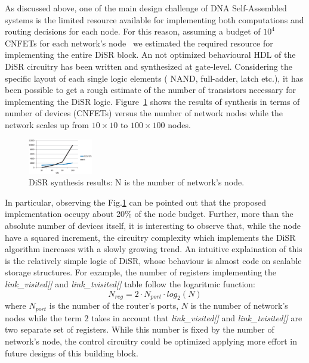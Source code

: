 As discussed above, one of the main design challenge of DNA
Self-Assembled systems is the limited resource available for
implementing both computations and routing decisions for each node.
For this reason, assuming a budget of $10^4$ CNFETs for each network's
node~\cite{liu_jetcs} we estimated the required resource for
implementing the entire DiSR block. An not optimized behavioural
HDL of the DiSR circuitry has been written and synthesized at gate-level.
Considering the specific layout of each single logic elements ( NAND,
full-adder, latch etc.), it has been possible to get a rough estimate
of the number of transistors necessary for implementing the DiSR
logic.  Figure~\ref{fig:imp_trend} shows the results of synthesis in
terms of number of devices (CNFETs) versus the number of network nodes
while the network scales up from $10\times10$ to $100\times100$ nodes.
\begin{figure}
  \centering
  \includegraphics[width=0.25\textwidth]{pictures/imp_rslt.eps}
  \caption{DiSR synthesis results: N is the number of network's node.}
 \label{fig:imp_trend}
\end{figure}
In particular, observing the Fig.\ref{fig:imp_trend} can 
be pointed out that the proposed implementation occupy  about 20\% of the node budget. 
Further, more than the absolute number of devices itself, it is interesting to
observe that, while the node have a squared increment, the circuitry
complexity which implements the DiSR algorithm increases with a slowly
growing trend.  
An intuitive explaination of this is the relatively simple logic of
DiSR, whose behaviour is almost code on scalable storage structures.
For example, the number of registers implementing the
\emph{link\_visited[]} and \emph{link\_tvisited[]} table follow the
logaritmic function:
\begin{equation}
  \label{eq:imp_trend}
  N_{reg}=2\cdot N_{port} \cdot log_2(N)
\end{equation}
where $N_{port}$ is the number of the router's ports, $N$ is the number 
of network's nodes while the term $2$ takes in account that \emph{link\_visited[]} and 
\emph{link\_tvisited[]} are two separate set of registers. While this number is fixed by 
the number of network's node, the control circuitry could be optimized applying more effort 
in future designs of this building block. 

